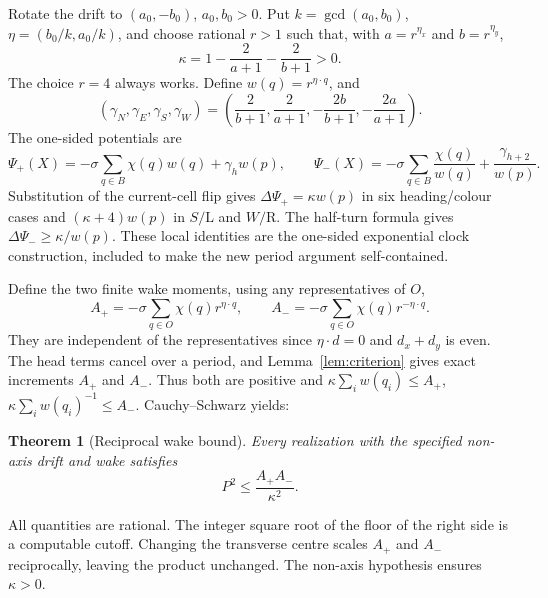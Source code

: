 \documentclass[11pt]{article}
\newtheorem{theorem}{Theorem}[section]
\theoremstyle{definition}\newtheorem{definition}[theorem]{Definition}
\newcommand{\R}{\mathrm R}
\newcommand{\Lturn}{\mathrm L}
\begin{document}
Rotate the drift to $(a_0,-b_0)$, $a_0,b_0>0$. Put
$k=\gcd(a_0,b_0)$, $\eta=(b_0/k,a_0/k)$, and choose rational $r>1$ such that,
with $a=r^{\eta_x}$ and $b=r^{\eta_y}$,
\[
 \kappa=1-\frac2{a+1}-\frac2{b+1}>0.
\]
The choice $r=4$ always works. Define $w(q)=r^{\eta\cdot q}$, and
\[
 (\gamma_N,\gamma_E,\gamma_S,\gamma_W)
 =\left(\frac2{b+1},\frac2{a+1},-\frac{2b}{b+1},-\frac{2a}{a+1}\right).
\]
The one-sided potentials are
\[
 \Psi_+(X)=-\sigma\sum_{q\in B}\chi(q)w(q)+\gamma_h w(p),\qquad
 \Psi_-(X)=-\sigma\sum_{q\in B}\frac{\chi(q)}{w(q)}+\frac{\gamma_{h+2}}{w(p)}.
\]
Substitution of the current-cell flip gives $\Delta\Psi_+=\kappa w(p)$ in six
heading/colour cases and $(\kappa+4)w(p)$ in $S/\Lturn$ and $W/\R$.
The half-turn formula gives $\Delta\Psi_-\ge\kappa/w(p)$. These local identities
are the one-sided exponential clock construction, included to make the new
period argument self-contained.

Define the two finite wake moments, using any representatives of $O$,
\[
 A_+=-\sigma\sum_{q\in O}\chi(q)r^{\eta\cdot q},\qquad
 A_-=-\sigma\sum_{q\in O}\chi(q)r^{-\eta\cdot q}.
\]
They are independent of the representatives since $\eta\cdot d=0$ and
$d_x+d_y$ is even. The head terms cancel over a period, and
Lemma~\ref{lem:criterion} gives exact increments $A_+$ and $A_-$. Thus both are
positive and $\kappa\sum_i w(q_i)\le A_+$,
$\kappa\sum_i w(q_i)^{-1}\le A_-$. Cauchy--Schwarz yields:
\begin{theorem}[Reciprocal wake bound]\label{thm:moment}
Every realization with the specified non-axis drift and wake satisfies
\begin{equation}\label{eq:moment}
 P^2\le \frac{A_+A_-}{\kappa^2}.
\end{equation}
\end{theorem}
All quantities are rational. The integer square root of the floor of the right
side is a computable cutoff. Changing the transverse centre scales $A_+$ and
$A_-$ reciprocally, leaving the product unchanged. The non-axis hypothesis ensures $\kappa>0$.
\end{document}

